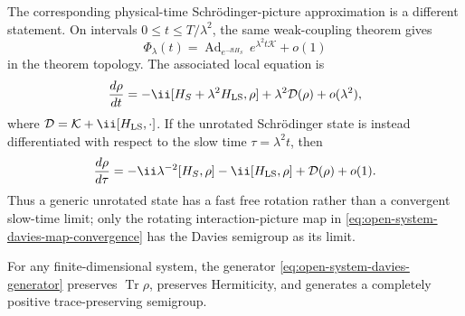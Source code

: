 The corresponding physical-time Schrödinger-picture approximation is a
different statement.  On intervals \(0\le t\le T/\lambda^2\), the same
weak-coupling theorem gives
\[
  \Phi_\lambda(t)
  =
  \operatorname{Ad}_{e^{-\ii tH_S}}\,
  e^{\lambda^2t\mathcal K}
  +o(1)
\]
in the theorem topology.  The associated local equation is
\begin{equation}
  \frac{d\rho}{dt}
  =
  -\ii[H_S+\lambda^2H_{\rm LS},\rho]
  +
  \lambda^2\mathcal D(\rho)
  +o(\lambda^2),
  \label{eq:open-system-schrodinger-physical-time-master}
\end{equation}
where \(\mathcal D=\mathcal K+\ii[H_{\rm LS},\cdot]\).  If the unrotated
Schrödinger state is instead differentiated with respect to the slow time
\(\tau=\lambda^2t\), then
\[
  \frac{d\rho}{d\tau}
  =
  -\ii\lambda^{-2}[H_S,\rho]
  -\ii[H_{\rm LS},\rho]
  +\mathcal D(\rho)+o(1).
\]
Thus a generic unrotated state has a fast free rotation rather than a
convergent slow-time limit; only the rotating interaction-picture map in
\eqref{eq:open-system-davies-map-convergence} has the Davies semigroup as its
limit.

\begin{proposition}
\label{prop:gksl-trace-cp}
For any finite-dimensional system, the generator
\eqref{eq:open-system-davies-generator} preserves
\(\operatorname{Tr}\rho\), preserves Hermiticity, and generates a completely
positive trace-preserving semigroup.
\end{proposition}

